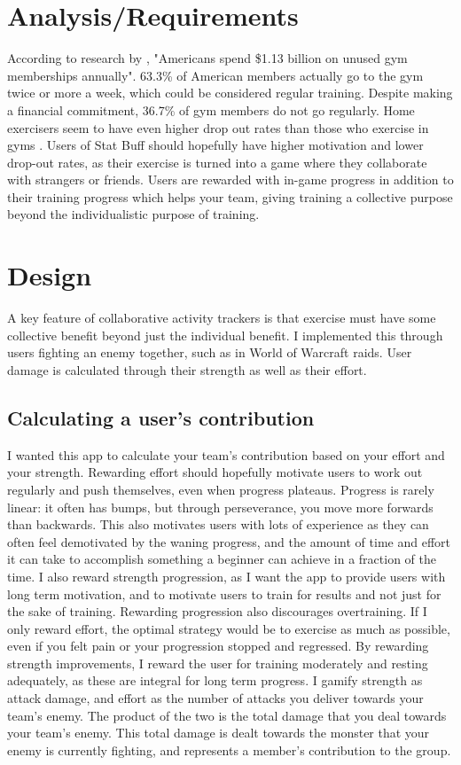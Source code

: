 \documentclass{l4proj}
\begin{document}
\chapter{Analysis/Requirements}
According to research by \citet{unused_memberships}, "Americans spend \$1.13 billion on unused gym memberships annually". 63.3\% of American members actually go to the gym twice or more a week, which could be considered regular training. Despite making a financial commitment, 36.7\% of gym members do not go regularly. Home exercisers seem to have even higher drop out rates than those who exercise in gyms \citep{home_vs_gym}. Users of Stat Buff should hopefully have higher motivation and lower drop-out rates, as their exercise is turned into a game where they collaborate with strangers or friends. Users are rewarded with in-game progress in addition to their training progress which helps your team, giving training a collective purpose beyond the individualistic purpose of training. 


\chapter{Design}

A key feature of collaborative activity trackers is that exercise must have some collective benefit beyond just the individual benefit. I implemented this through users fighting an enemy together, such as in World of Warcraft raids. User damage is calculated through their strength as well as their effort. 

\section{Calculating a user's contribution}
I wanted this app to calculate your team's contribution based on your effort and your strength. Rewarding effort should hopefully motivate users to work out regularly and push themselves, even when progress plateaus. Progress is rarely linear: it often has bumps, but through perseverance, you move more forwards than backwards. This also motivates users with lots of experience as they can often feel demotivated by the waning progress, and the amount of time and effort it can take to accomplish something a beginner can achieve in a fraction of the time. I also reward strength progression, as I want the app to provide users with long term motivation, and to motivate users to train for results and not just for the sake of training. Rewarding progression also discourages overtraining. If I only reward effort, the optimal strategy would be to exercise as much as possible, even if you felt pain or your progression stopped and regressed. By rewarding strength improvements, I reward the user for training moderately and resting adequately, as these are integral for long term progress. I gamify strength as attack damage, and effort as the number of attacks you deliver towards your team's enemy. The product of the two is the total damage that you deal towards your team's enemy. This total damage is dealt towards the monster that your enemy is currently fighting, and represents a member's contribution to the group.
\end{document}
